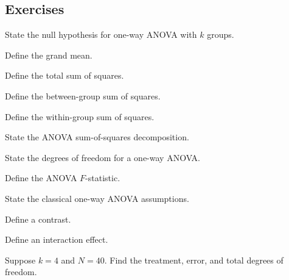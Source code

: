\subsection{Exercises}
\label{subsec:anova-exercises}

\begin{exercise}[1]
State the null hypothesis for one-way ANOVA with \(k\) groups.
\end{exercise}

\begin{exercise}[1]
Define the grand mean.
\end{exercise}

\begin{exercise}[1]
Define the total sum of squares.
\end{exercise}

\begin{exercise}[1]
Define the between-group sum of squares.
\end{exercise}

\begin{exercise}[1]
Define the within-group sum of squares.
\end{exercise}

\begin{exercise}[1]
State the ANOVA sum-of-squares decomposition.
\end{exercise}

\begin{exercise}[1]
State the degrees of freedom for a one-way ANOVA.
\end{exercise}

\begin{exercise}[1]
Define the ANOVA \(F\)-statistic.
\end{exercise}

\begin{exercise}[1]
State the classical one-way ANOVA assumptions.
\end{exercise}

\begin{exercise}[1]
Define a contrast.
\end{exercise}

\begin{exercise}[1]
Define an interaction effect.
\end{exercise}

\begin{exercise}[2]
Suppose \(k=4\) and \(N=40\). Find the treatment, error, and total
degrees of freedom.
\end{exercise}

